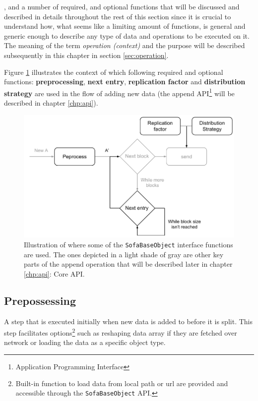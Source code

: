 , and a number of required, and optional functions that will be discussed and described in details throughout the rest of this section since it is crucial to understand how, what seems like a limiting amount of functions, is general and generic enough to describe any type of data and operations to be executed on it. The meaning of the term \textit{operation (context)} and the purpose will be described subsequently in this chapter in section \ref{sec:operation}. 
\newline

Figure \ref{fig:preprocess-nextentry} illustrates the context of which following required and optional functions: \textbf{preprocessing}, \textbf{next entry}, \textbf{replication factor} and \textbf{distribution strategy} are used in the flow of adding new data (the append API\footnote{Application Programming Interface} will be described in chapter \ref{chp:api}).

\begin{figure}
	\centering
	\includegraphics[scale=0.8]{pdf/preprocess-nextentry.pdf}
	\caption[\texttt{SofaBaseObject} interface functions]{Illustration of where some of the \texttt{SofaBaseObject} interface functions are used. The ones depicted in a light shade of gray are other key parts of the append operation that will be described later in chapter \ref{chp:api}: Core API. \label{fig:preprocess-nextentry}}
\end{figure}	

\subsection{Prepossessing}
A step that is executed initially when new data is added to \CodeName before it is split. This step facilitates options\footnote{Built-in \CodeName function to load data from local path or url are provided and accessible through the \texttt{SofaBaseObject} API.} such as reshaping data array if they are fetched over network or loading the data as a specific object type.

